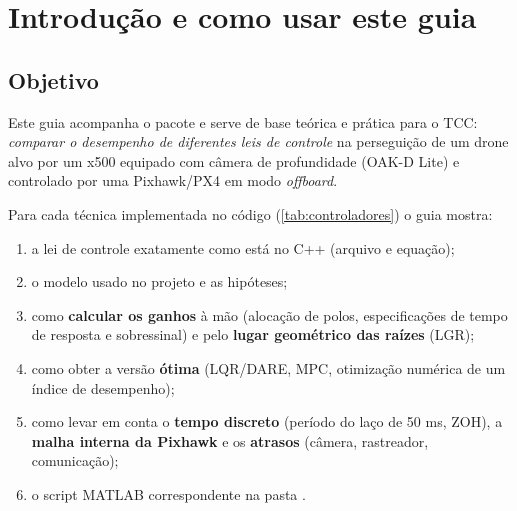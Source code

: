 \chapter{Introdução e como usar este guia}

\section{Objetivo}
Este guia acompanha o pacote  e serve de base teórica e prática
para o TCC: \emph{comparar o desempenho de diferentes leis de controle} na perseguição
de um drone alvo por um x500 equipado com câmera de profundidade (OAK-D Lite) e
controlado por uma Pixhawk/PX4 em modo \emph{offboard}.

Para cada técnica implementada no código (\cref{tab:controladores}) o guia mostra:
\begin{enumerate}
  \item a lei de controle exatamente como está no C++ (arquivo e equação);
  \item o modelo usado no projeto e as hipóteses;
  \item como \textbf{calcular os ganhos} à mão (alocação de polos, especificações de
        tempo de resposta e sobressinal) e pelo \textbf{lugar geométrico das raízes} (LGR);
  \item como obter a versão \textbf{ótima} (LQR/DARE, MPC, otimização numérica de um
        índice de desempenho);
  \item como levar em conta o \textbf{tempo discreto} (período do laço de 50 ms, ZOH),
        a \textbf{malha interna da Pixhawk} e os \textbf{atrasos} (câmera, rastreador,
        comunicação);
  \item o script MATLAB correspondente na pasta .
\end{enumerate}

